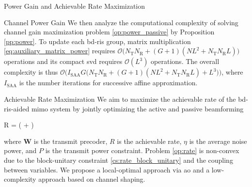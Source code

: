 \documentclass[journal]{IEEEtran}
\begin{document}
\begin{section}{Power Gain and Achievable Rate Maximization}
\begin{subsection}{Channel Power Gain}
		We then analyze the computational complexity of solving channel gain maximization problem \eqref{op:power_passive} by Proposition \ref{pp:power}.
		To update each \gls{bd}-\gls{ris} group, matrix multiplication \eqref{eq:auxiliary_matrix_power} requires $\mathcal{O}\bigl(N_\mathrm{T} N_\mathrm{R} + (G+1)(NL^2+N_\mathrm{T} N_\mathrm{R} L)\bigr)$ operations and its compact \gls{svd} requires $\mathcal{O}(L^3)$ operations.
		The overall complexity is thus $\mathcal{O}\bigl(I_\text{SAA} G \bigl(N_\mathrm{T} N_\mathrm{R} + (G+1)(NL^2+N_\mathrm{T} N_\mathrm{R} L) + L^3\bigr)\bigr)$, where $I_\text{SAA}$ is the number iterations for successive affine approximation.
	\end{subsection}

	\begin{subsection}{Achievable Rate Maximization}\label{sc:rate}
		We aim to maximize the achievable rate of the \gls{bd}-\gls{ris}-aided \gls{mimo} system by jointly optimizing the active and passive beamforming
		\begin{maxi!}
			{}{R = \log \det \biggl( + \biggr)}{\label{op:rate}}{\label{ob:rate}}
		\end{maxi!}
		where $\mathbf{W}$ is the transmit precoder, $R$ is the achievable rate, $\eta$ is the average noise power, and $P$ is the transmit power constraint.
		Problem \eqref{op:rate} is non-convex due to the block-unitary constraint \eqref{cs:rate_block_unitary} and the coupling between variables.
		We propose a local-optimal approach via \gls{ao} and a low-complexity approach based on channel shaping.


\end{subsection}
\end{section}
\end{document}
